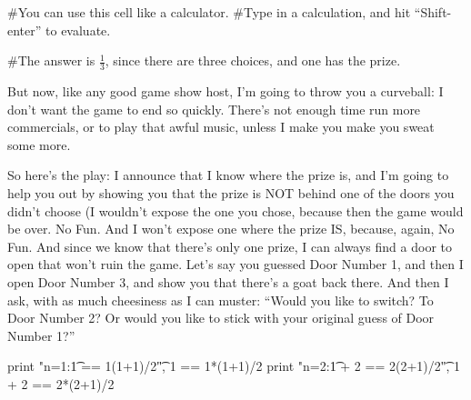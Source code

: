 \begin{sageverbatim}
#You can use this cell like a calculator.  
#Type in a calculation, and hit ``Shift-enter'' to evaluate.
\end{sageverbatim}


\begin{sageverbatim}
#The answer is $\frac{1}{3}$, since there are three choices, and one has the prize.
\end{sageverbatim}


But now, like any good game show host, I'm going to throw you a
curveball: I don't want the game to end so quickly.  There's not
enough time run more commercials, or to play that awful music, unless
I make you make you sweat some more. 


So here's the play: I announce that I know where the prize is, and I'm
going to help you out by showing you that the prize is NOT behind one
of the doors you didn't choose (I wouldn't expose the one you chose,
because then the game would be over.  No Fun.  And I won't expose one
where the prize IS, because, again, No Fun. And since we know that
there's only one prize, I can always find a door to open that won't
ruin the game.  Let's say you guessed Door Number 1, and then I open
Door Number 3, and show you that there's a goat back there.  And then
I ask, with as much cheesiness as I can muster: ``Would you like to
switch?  To Door Number 2?  Or would you like to stick with your
original guess of Door Number 1?''




\begin{sageverbatim}
print "n=1:\t     1 == 1(1+1)/2\t", 1 == 1*(1+1)/2  
print "n=2:\t 1 + 2 == 2(2+1)/2\t", 1 + 2 == 2*(2+1)/2
\end{sageverbatim}












